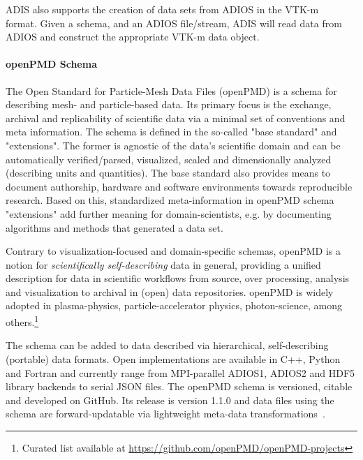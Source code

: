 ADIS also supports the creation of data sets from ADIOS in the VTK-m~\cite{moreland2016} format. Given a schema, and an ADIOS file/stream, ADIS will read data from ADIOS and construct the appropriate VTK-m data object.

\paragraph{\textbf{openPMD Schema}}

The Open Standard for Particle-Mesh Data Files (openPMD) is a schema for describing mesh- and particle-based data.
Its primary focus is the exchange, archival and replicability of scientific data via a minimal set of conventions and meta information.
The schema is defined in the so-called "base standard" and "extensions".
The former is agnostic of the data's scientific domain and can be automatically verified/parsed, visualized, scaled and dimensionally analyzed (describing units and quantities).
The base standard also provides means to document authorship, hardware and software environments towards reproducible research.
Based on this, standardized meta-information in openPMD schema "extensions" add further meaning for domain-scientists, e.g. by documenting algorithms and methods that generated a data set.

Contrary to visualization-focused and domain-specific schemas, openPMD is a notion for \textit{scientifically self-describing} data in general, providing a unified description for data in scientific workflows from source, over processing, analysis and visualization to archival in (open) data repositories.
openPMD is widely adopted in plasma-physics, particle-accelerator physics, photon-science, among others.\footnote{Curated list available at \url{https://github.com/openPMD/openPMD-projects}}

The schema can be added to data described via hierarchical, self-describing (portable) data formats.
Open implementations are available in C++, Python and Fortran and currently range from MPI-parallel ADIOS1, ADIOS2 and HDF5 library backends to serial JSON files.
The openPMD schema is versioned, citable and developed on GitHub.
Its release is version 1.1.0 and data files using the schema are forward-updatable via lightweight meta-data transformations~\cite{HueblopenPMD}.


